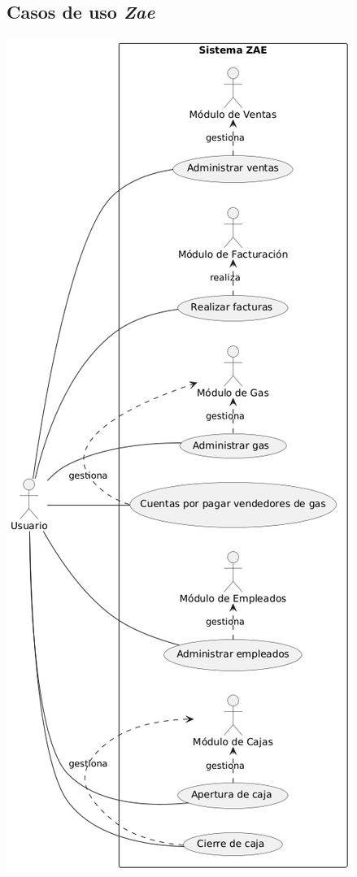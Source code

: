 \documentclass[protocolo.tex]{subfiles}
\begin{document}
\subsection{Casos de uso \textit{Zae}} 
\includegraphics[scale=0.5]{Imagenes/zae.png}
\end{document}
